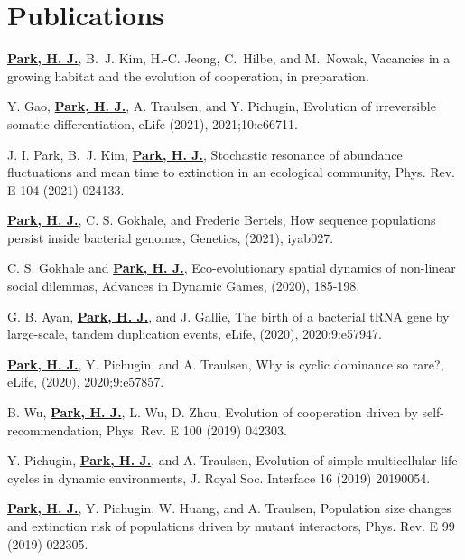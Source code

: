 \documentclass[11pt,a4paper,sans]{moderncv}        %
\begin{document}
\section{Publications}
\renewcommand{\labelenumi}{[\theenumi]} 
\begin{etaremune}
\item
\underline{\textbf{Park, H. J.}}, B.~J. Kim, H.-C. Jeong, C.~Hilbe, and M.~Nowak, Vacancies in a growing habitat and the evolution of cooperation, in preparation.

\item
Y. Gao, \underline{\textbf{Park, H. J.}}, A. Traulsen, and Y. Pichugin, Evolution of irreversible somatic differentiation, eLife (2021), 2021;10:e66711.

\item
J. I. Park, B.~J. Kim, \underline{\textbf{Park, H. J.}}, Stochastic resonance of abundance fluctuations and mean time to extinction in an ecological community,  Phys. Rev. E 104 (2021) 024133.

\item
\underline{\textbf{Park, H. J.}}, C. S. Gokhale, and Frederic Bertels, How sequence populations persist inside bacterial genomes, Genetics, (2021), iyab027.

\item
C. S. Gokhale and \underline{\textbf{Park, H. J.}},
Eco-evolutionary spatial dynamics of non-linear social dilemmas, Advances in Dynamic Games, (2020), 185-198.

\item
G. B. Ayan, \underline{\textbf{Park, H. J.}}, and J. Gallie, The birth of a bacterial tRNA gene by large-scale, tandem duplication events, eLife, (2020), 2020;9:e57947.

\item
\underline{\textbf{Park, H. J.}}, Y. Pichugin, and A. Traulsen, Why is cyclic dominance so rare?,  eLife, (2020),  2020;9:e57857.

\item
B. Wu, \underline{\textbf{Park, H. J.}}, L. Wu, D. Zhou,
Evolution of cooperation driven by self-recommendation, Phys. Rev. E 100 (2019) 042303.
  
\item
Y. Pichugin, \underline{\textbf{Park, H. J.}}, and A. Traulsen,
Evolution of simple multicellular life cycles in dynamic environments, J. Royal Soc. Interface 16 (2019) 20190054.
  
\item
\underline{\textbf{Park, H. J.}}, Y. Pichugin, W. Huang, and A. Traulsen,
Population size changes and extinction risk of populations driven by mutant interactors, Phys. Rev. E 99 (2019) 022305.


\end{etaremune}
\end{document}
